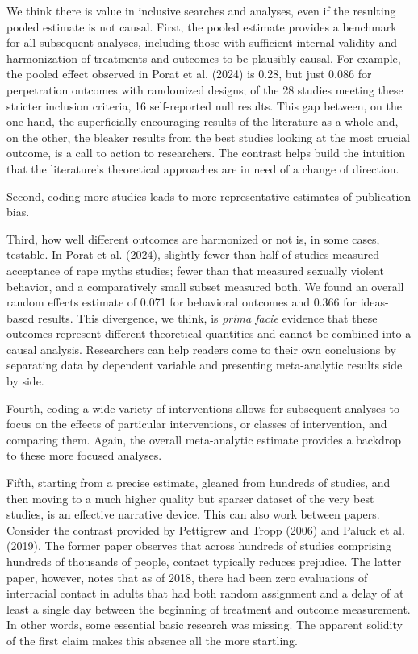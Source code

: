 \documentclass[
  ,jou]{apa6}
\begin{document}
We think there is value in inclusive searches and analyses, even if the resulting pooled estimate is not causal. First, the pooled estimate provides a benchmark for all subsequent analyses, including those with sufficient internal validity and harmonization of treatments and outcomes to be plausibly causal. For example, the pooled effect observed in Porat et al. (2024) is 0.28, but just 0.086 for perpetration outcomes with randomized designs; of the 28 studies meeting these stricter inclusion criteria, 16 self-reported null results. This gap between, on the one hand, the superficially encouraging results of the literature as a whole and, on the other, the bleaker results from the best studies looking at the most crucial outcome, is a call to action to researchers. The contrast helps build the intuition that the literature's theoretical approaches are in need of a change of direction.

Second, coding more studies leads to more representative estimates of publication bias.

Third, how well different outcomes are harmonized or not is, in some cases, testable. In Porat et al. (2024), slightly fewer than half of studies measured acceptance of rape myths studies; fewer than that measured sexually violent behavior, and a comparatively small subset measured both. We found an overall random effects estimate of 0.071 for behavioral outcomes and 0.366 for ideas-based results. This divergence, we think, is \emph{prima facie} evidence that these outcomes represent different theoretical quantities and cannot be combined into a causal analysis. Researchers can help readers come to their own conclusions by separating data by dependent variable and presenting meta-analytic results side by side.

Fourth, coding a wide variety of interventions allows for subsequent analyses to focus on the effects of particular interventions, or classes of intervention, and comparing them. Again, the overall meta-analytic estimate provides a backdrop to these more focused analyses.

Fifth, starting from a precise estimate, gleaned from hundreds of studies, and then moving to a much higher quality but sparser dataset of the very best studies, is an effective narrative device. This can also work between papers. Consider the contrast provided by Pettigrew and Tropp (2006) and Paluck et al. (2019). The former paper observes that across hundreds of studies comprising hundreds of thousands of people, contact typically reduces prejudice. The latter paper, however, notes that as of 2018, there had been zero evaluations of interracial contact in adults that had both random assignment and a delay of at least a single day between the beginning of treatment and outcome measurement. In other words, some essential basic research was missing. The apparent solidity of the first claim makes this absence all the more startling.
\end{document}
